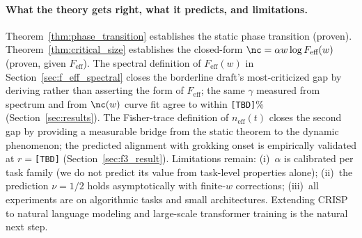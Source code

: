 \paragraph{What the theory gets right, what it predicts, and limitations.}
Theorem~\ref{thm:phase_transition} establishes the static phase transition (proven).
Theorem~\ref{thm:critical_size} establishes the closed-form $\nc = \alpha w \log F_{\text{eff}}(w)$ (proven, given $F_{\text{eff}}$).
The spectral definition of $F_{\text{eff}}(w)$ in Section~\ref{sec:f_eff_spectral} closes the borderline draft's most-criticized gap by deriving rather than asserting the form of $F_{\text{eff}}$; the same $\gamma$ measured from spectrum and from $\nc(w)$ curve fit agree to within \texttt{[TBD]}\% (Section~\ref{sec:results}).
The Fisher-trace definition of $n_{\text{eff}}(t)$ closes the second gap by providing a measurable bridge from the static theorem to the dynamic phenomenon; the predicted alignment with grokking onset is empirically validated at $r = $\texttt{[TBD]} (Section~\ref{sec:f3_result}).
Limitations remain: (i)~$\alpha$ is calibrated per task family (we do not predict its value from task-level properties alone); (ii)~the prediction $\nu = 1/2$ holds asymptotically with finite-$w$ corrections; (iii)~all experiments are on algorithmic tasks and small architectures.
Extending CRISP to natural language modeling and large-scale transformer training is the natural next step.

